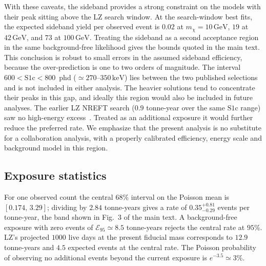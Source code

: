 \documentclass[aps,prl,twocolumn,superscriptaddress,nofootinbib,floatfix,longbibliography]{revtex4-2}
\newcommand{\keV}{\ensuremath{\,\mathrm{keV}}}
\newcommand{\GeV}{\ensuremath{\,\mathrm{GeV}}}
\newcommand{\mchi}{\ensuremath{m_\chi}}
\begin{document}
With these caveats, the sideband provides a strong constraint on the models with their peak sitting above the LZ search window. At the search-window best fits, the expected sideband yield per observed event is $0.02$ at $\mchi = 10\GeV$, $19$ at $42\GeV$, and $73$ at $100\GeV$. Treating the sideband as a second acceptance region in the same background-free likelihood gives the bounds quoted in the main text. This conclusion is robust to small errors in the assumed sideband efficiency, because the over-prediction is one to two orders of magnitude. The interval $600 < \mathrm{S1c} < 800$~phd ($\simeq 270$--$350\keV$) lies between the two published selections and is not included in either analysis. The heavier solutions tend to concentrate their peaks in this gap, and ideally this region would also be included in future analyses. The earlier LZ NREFT search ($0.9$ tonne-year over the same $\mathrm{S1c}$ range) saw no high-energy excess~\cite{LZ:2023lvz}. Treated as an additional exposure it would further reduce the preferred rate. We emphasize that the present analysis is no substitute for a collaboration analysis, with a properly calibrated efficiency, energy scale and background model in this region.


\subsection{Exposure statistics}

For one observed count the central $68\%$ interval on the Poisson mean is $[0.174,\,3.29]$; dividing by $2.84$ tonne-years gives a rate of $0.35^{+0.81}_{-0.29}$ events per tonne-year, the band shown in Fig.~3 of the main text. A background-free exposure with zero events of $\mathcal{E}_{95} \simeq 8.5$ tonne-years rejects the central rate at $95\%$. LZ's projected $1000$ live days at the present fiducial mass corresponds to $12.9$ tonne-years and $4.5$ expected events at the central rate. The Poisson probability of observing no additional events beyond the current exposure is $e^{-3.5} \simeq 3\%$.
\end{document}

